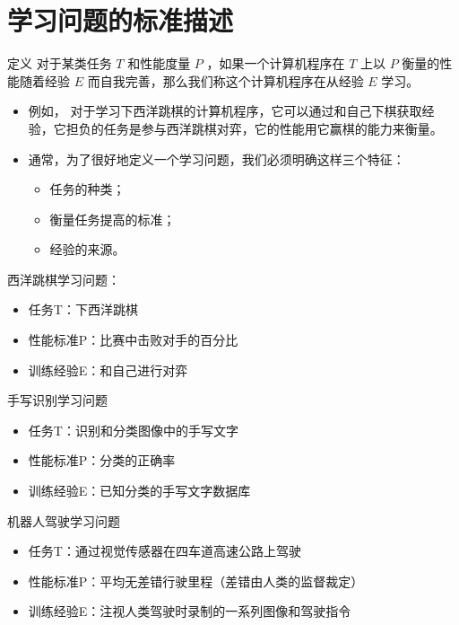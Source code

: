 \documentclass[presentation]{beamer}
\begin{document}
\section{学习问题的标准描述}
\label{sec:org6f744ac}
\begin{frame}[label={sec:orgb735725}]{定义}
对于某类任务 \(T\) 和性能度量 \(P\) ，如果一个计算机程序在 \(T\) 上以 \(P\) 衡量的性能随着经验 \(E\) 而自我完善，那么我们称这个计算机程序在从经验 \(E\) 学习。

\begin{itemize}
\item 例如， 对于学习下西洋跳棋的计算机程序，它可以通过和自己下棋获取经验，它担负的任务是参与西洋跳棋对弈，它的性能用它赢棋的能力来衡量。
\item 通常，为了很好地定义一个学习问题，我们必须明确这样三个特征：
\begin{itemize}
\item 任务的种类；
\item 衡量任务提高的标准；
\item 经验的来源。
\end{itemize}
\end{itemize}
\end{frame}

\begin{frame}[label={sec:orgb69bb99}]{西洋跳棋学习问题：}
\begin{itemize}
\item 任务T：下西洋跳棋
\item 性能标准P：比赛中击败对手的百分比
\item 训练经验E：和自己进行对弈
\end{itemize}
\end{frame}

\begin{frame}[label={sec:orgccece9e}]{手写识别学习问题}
\begin{itemize}
\item 任务T：识别和分类图像中的手写文字
\item 性能标准P：分类的正确率
\item 训练经验E：已知分类的手写文字数据库
\end{itemize}
\end{frame}
\begin{frame}[label={sec:org1a9bf54}]{机器人驾驶学习问题}
\begin{itemize}
\item 任务T：通过视觉传感器在四车道高速公路上驾驶
\item 性能标准P：平均无差错行驶里程（差错由人类的监督裁定）
\item 训练经验E：注视人类驾驶时录制的一系列图像和驾驶指令
\end{itemize}
\end{frame}
\end{document}
